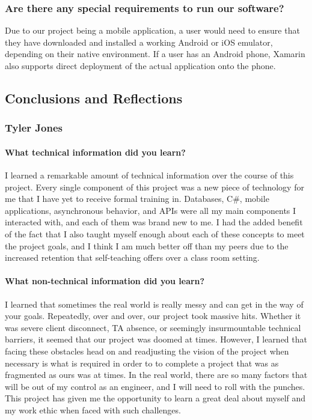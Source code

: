 \documentclass[onecolumn, draftclsnofoot,10pt, compsoc]{IEEEtran}
\begin{document}
\subsubsection{Are there any special requirements to run our software?}
Due to our project being a mobile application, a user would need to ensure that they have downloaded and installed a working Android or iOS emulator, depending on their native environment. If a user has an Android phone, Xamarin also supports direct deployment of the actual application onto the phone.

\newpage

\subsection{Conclusions and Reflections}
\subsubsection{Tyler Jones}
\paragraph{What technical information did you learn?}
I learned a remarkable amount of technical information over the course of this project. Every single component of this project was a new piece of technology for me that I have yet to receive formal training in. Databases, C\#, mobile applications, asynchronous behavior, and APIs were all my main components I interacted with, and each of them was brand new to me. I had the added benefit of the fact that I also taught myself enough about each of these concepts to meet the project goals, and I think I am much better off than my peers due to the increased retention that self-teaching offers over a class room setting.
\paragraph{What non-technical information did you learn?}
I learned that sometimes the real world is really messy and can get in the way of your goals. Repeatedly, over and over, our project took massive hits. Whether it was severe client disconnect, TA absence, or seemingly insurmountable technical barriers, it seemed that our project was doomed at times. However, I learned that facing these obstacles head on and readjusting the vision of the project when necessary is what is required in order to to complete a project that was as fragmented as ours was at times. In the real world, there are so many factors that will be out of my control as an engineer, and I will need to roll with the punches. This project has given me the opportunity to learn a great deal about myself and my work ethic when faced with such challenges.
\end{document}
